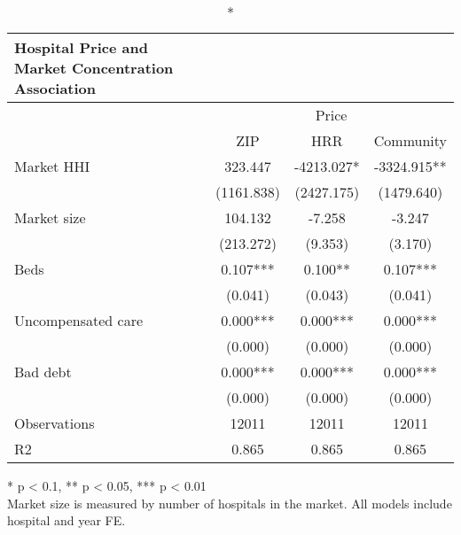 \setlength{\LTpost}{0mm}
\begin{longtable}{lccc}
\caption*{
{\large Hospital Price and Market Concentration Association}
} \\ 
\toprule
 & \multicolumn{3}{c}{Price} \\ 
\cmidrule(lr){2-4}
  & ZIP & HRR & Community \\ 
\midrule\addlinespace[2.5pt]
Market HHI & 323.447 & -4213.027* & -3324.915** \\ 
 & (1161.838) & (2427.175) & (1479.640) \\ 
Market size & 104.132 & -7.258 & -3.247 \\ 
 & (213.272) & (9.353) & (3.170) \\ 
Beds & 0.107*** & 0.100** & 0.107*** \\ 
 & (0.041) & (0.043) & (0.041) \\ 
Uncompensated care & 0.000*** & 0.000*** & 0.000*** \\ 
 & (0.000) & (0.000) & (0.000) \\ 
Bad debt & 0.000*** & 0.000*** & 0.000*** \\ 
 & (0.000) & (0.000) & (0.000) \\ 
Observations & 12011 & 12011 & 12011 \\ 
R2 & 0.865 & 0.865 & 0.865 \\ 
\bottomrule
\end{longtable}
\begin{minipage}{\linewidth}
* p < 0.1, ** p < 0.05, *** p < 0.01\\
Market size is measured by number of hospitals in the market. 
                   All models include hospital and year FE.\\
\end{minipage}

